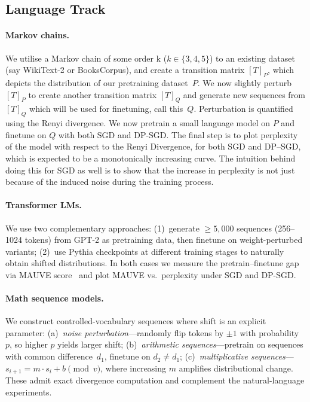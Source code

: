 \documentclass{article}
\begin{document}
\subsection{Language Track}

\paragraph{Markov chains.}
We utilise a Markov chain of some order k ($k \in \{3, 4, 5\}$) to an existing dataset (say WikiText-2 or BooksCorpus), and create a transition matrix $[T]_P$, which depicts the distribution of our pretraining dataset~$P$. We now slightly perturb $[T]_P$ to create another transition matrix $[T]_Q$ and generate new sequences from $[T]_Q$ which will be used for finetuning, call this~$Q$. Perturbation is quantified using the Renyi divergence. We now pretrain a small language model on $P$ and finetune on $Q$ with both SGD and DP-SGD. The final step is to plot perplexity of the model with respect to the Renyi Divergence, for both SGD and DP--SGD, which is expected to be a monotonically increasing curve. The intuition behind doing this for SGD as well is to show that the increase in perplexity is not just because of the induced noise during the training process.

\paragraph{Transformer LMs.}
We use two complementary approaches: (1)~generate ${\geq}5{,}000$ sequences (256--1024 tokens) from GPT-2 as pretraining data, then finetune on weight-perturbed variants; (2)~use Pythia checkpoints at different training stages to naturally obtain shifted distributions. In both cases we measure the pretrain--finetune gap via MAUVE score~\cite{pillutla2023mauve} and plot MAUVE vs.\ perplexity under SGD and DP-SGD.

\paragraph{Math sequence models.}
We construct controlled-vocabulary sequences where shift is an explicit parameter: (a)~\emph{noise perturbation}---randomly flip tokens by $\pm 1$ with probability~$p$, so higher $p$ yields larger shift; (b)~\emph{arithmetic sequences}---pretrain on sequences with common difference~$d_1$, finetune on $d_2 \neq d_1$; (c)~\emph{multiplicative sequences}---$s_{i+1} = m \cdot s_i + b \pmod{v}$, where increasing $m$ amplifies distributional change. These admit exact divergence computation and complement the natural-language experiments.
\end{document}
